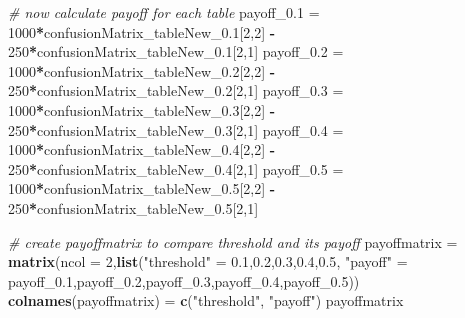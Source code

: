 \documentclass[
]{article}
\newenvironment{Shaded}{\begin{snugshade}}{\end{snugshade}}
\newcommand{\CommentTok}[1]{\textcolor[rgb]{0.56,0.35,0.01}{\textit{#1}}}
\newcommand{\DataTypeTok}[1]{\textcolor[rgb]{0.13,0.29,0.53}{#1}}
\newcommand{\DecValTok}[1]{\textcolor[rgb]{0.00,0.00,0.81}{#1}}
\newcommand{\FloatTok}[1]{\textcolor[rgb]{0.00,0.00,0.81}{#1}}
\newcommand{\KeywordTok}[1]{\textcolor[rgb]{0.13,0.29,0.53}{\textbf{#1}}}
\newcommand{\NormalTok}[1]{#1}
\newcommand{\OperatorTok}[1]{\textcolor[rgb]{0.81,0.36,0.00}{\textbf{#1}}}
\newcommand{\StringTok}[1]{\textcolor[rgb]{0.31,0.60,0.02}{#1}}
\begin{document}
\begin{Shaded}
\begin{Highlighting}[]
\CommentTok{# now calculate payoff for each table }
\NormalTok{payoff_}\FloatTok{0.1}\NormalTok{ =}\StringTok{ }\DecValTok{1000}\OperatorTok{*}\NormalTok{confusionMatrix_tableNew_}\FloatTok{0.1}\NormalTok{[}\DecValTok{2}\NormalTok{,}\DecValTok{2}\NormalTok{] }\OperatorTok{-}\StringTok{ }\DecValTok{250}\OperatorTok{*}\NormalTok{confusionMatrix_tableNew_}\FloatTok{0.1}\NormalTok{[}\DecValTok{2}\NormalTok{,}\DecValTok{1}\NormalTok{]}
\NormalTok{payoff_}\FloatTok{0.2}\NormalTok{ =}\StringTok{ }\DecValTok{1000}\OperatorTok{*}\NormalTok{confusionMatrix_tableNew_}\FloatTok{0.2}\NormalTok{[}\DecValTok{2}\NormalTok{,}\DecValTok{2}\NormalTok{] }\OperatorTok{-}\StringTok{ }\DecValTok{250}\OperatorTok{*}\NormalTok{confusionMatrix_tableNew_}\FloatTok{0.2}\NormalTok{[}\DecValTok{2}\NormalTok{,}\DecValTok{1}\NormalTok{]}
\NormalTok{payoff_}\FloatTok{0.3}\NormalTok{ =}\StringTok{ }\DecValTok{1000}\OperatorTok{*}\NormalTok{confusionMatrix_tableNew_}\FloatTok{0.3}\NormalTok{[}\DecValTok{2}\NormalTok{,}\DecValTok{2}\NormalTok{] }\OperatorTok{-}\StringTok{ }\DecValTok{250}\OperatorTok{*}\NormalTok{confusionMatrix_tableNew_}\FloatTok{0.3}\NormalTok{[}\DecValTok{2}\NormalTok{,}\DecValTok{1}\NormalTok{]}
\NormalTok{payoff_}\FloatTok{0.4}\NormalTok{ =}\StringTok{ }\DecValTok{1000}\OperatorTok{*}\NormalTok{confusionMatrix_tableNew_}\FloatTok{0.4}\NormalTok{[}\DecValTok{2}\NormalTok{,}\DecValTok{2}\NormalTok{] }\OperatorTok{-}\StringTok{ }\DecValTok{250}\OperatorTok{*}\NormalTok{confusionMatrix_tableNew_}\FloatTok{0.4}\NormalTok{[}\DecValTok{2}\NormalTok{,}\DecValTok{1}\NormalTok{]}
\NormalTok{payoff_}\FloatTok{0.5}\NormalTok{ =}\StringTok{ }\DecValTok{1000}\OperatorTok{*}\NormalTok{confusionMatrix_tableNew_}\FloatTok{0.5}\NormalTok{[}\DecValTok{2}\NormalTok{,}\DecValTok{2}\NormalTok{] }\OperatorTok{-}\StringTok{ }\DecValTok{250}\OperatorTok{*}\NormalTok{confusionMatrix_tableNew_}\FloatTok{0.5}\NormalTok{[}\DecValTok{2}\NormalTok{,}\DecValTok{1}\NormalTok{]}

\CommentTok{# create payoffmatrix to compare threshold and its payoff}
\NormalTok{payoffmatrix =}\StringTok{ }\KeywordTok{matrix}\NormalTok{(}\DataTypeTok{ncol =} \DecValTok{2}\NormalTok{,}\KeywordTok{list}\NormalTok{(}\StringTok{"threshold"}\NormalTok{ =}\StringTok{ }\FloatTok{0.1}\NormalTok{,}\FloatTok{0.2}\NormalTok{,}\FloatTok{0.3}\NormalTok{,}\FloatTok{0.4}\NormalTok{,}\FloatTok{0.5}\NormalTok{,}
     \StringTok{"payoff"}\NormalTok{ =}\StringTok{ }\NormalTok{payoff_}\FloatTok{0.1}\NormalTok{,payoff_}\FloatTok{0.2}\NormalTok{,payoff_}\FloatTok{0.3}\NormalTok{,payoff_}\FloatTok{0.4}\NormalTok{,payoff_}\FloatTok{0.5}\NormalTok{))}
\KeywordTok{colnames}\NormalTok{(payoffmatrix) =}\StringTok{ }\KeywordTok{c}\NormalTok{(}\StringTok{"threshold"}\NormalTok{, }\StringTok{"payoff"}\NormalTok{)}
\NormalTok{payoffmatrix}
\end{Highlighting}
\end{Shaded}
\end{document}
